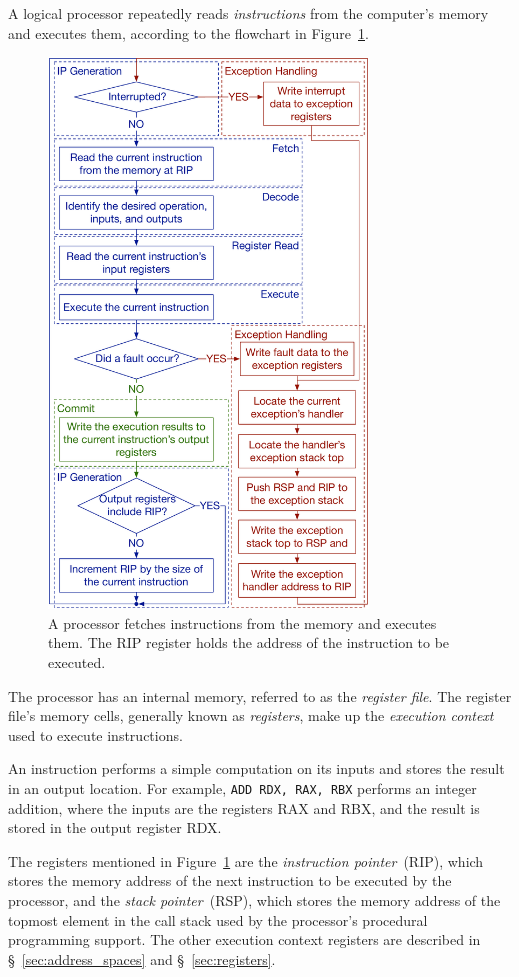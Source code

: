 A logical processor repeatedly reads \textit{instructions} from the
computer's memory and executes them, according to the flowchart in
Figure~\ref{fig:processor_execution}.

\begin{figure}[hbt]
  \centering
  \includegraphics[width=85mm]{figures/processor_execution.pdf}
  \caption{
    A processor fetches instructions from the memory and executes them. The RIP
    register holds the address of the instruction to be executed.
  }
  \label{fig:processor_execution}
\end{figure}

The processor has an internal memory, referred to as the
\textit{register file}. The register file's memory cells, generally known as
\textit{registers}, make up the \textit{execution context} used to execute
instructions.

An instruction performs a simple computation on its inputs and stores the
result in an output location. For example, \texttt{ADD RDX, RAX, RBX} performs
an integer addition, where the inputs are the registers RAX and RBX, and the
result is stored in the output register RDX.

The registers mentioned in Figure~\ref{fig:processor_execution} are the
\textit{instruction pointer}~(RIP), which stores the memory  address of the
next instruction to be executed by the processor, and the
\textit{stack pointer}~(RSP), which stores the memory address of the topmost
element in the call stack used by the processor's procedural programming
support. The other execution context registers are described in
\S~\ref{sec:address_spaces} and \S~\ref{sec:registers}.

